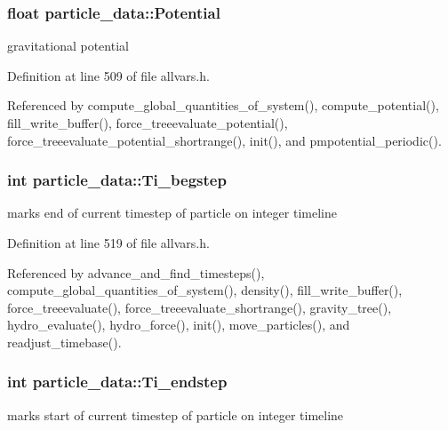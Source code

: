 \hypertarget{structparticle__data_a9d45a0cefc6121831905e169072550d0}{
\subsubsection[{Potential}]{\setlength{\rightskip}{0pt plus 5cm}float {\bf particle\_\-data::Potential}}}
\label{structparticle__data_a9d45a0cefc6121831905e169072550d0}
gravitational potential 

Definition at line 509 of file allvars.h.



Referenced by compute\_\-global\_\-quantities\_\-of\_\-system(), compute\_\-potential(), fill\_\-write\_\-buffer(), force\_\-treeevaluate\_\-potential(), force\_\-treeevaluate\_\-potential\_\-shortrange(), init(), and pmpotential\_\-periodic().

\hypertarget{structparticle__data_a6c9f057d234839cecaaeffc87b7a9794}{
\subsubsection[{Ti\_\-begstep}]{\setlength{\rightskip}{0pt plus 5cm}int {\bf particle\_\-data::Ti\_\-begstep}}}
\label{structparticle__data_a6c9f057d234839cecaaeffc87b7a9794}
marks end of current timestep of particle on integer timeline 

Definition at line 519 of file allvars.h.



Referenced by advance\_\-and\_\-find\_\-timesteps(), compute\_\-global\_\-quantities\_\-of\_\-system(), density(), fill\_\-write\_\-buffer(), force\_\-treeevaluate(), force\_\-treeevaluate\_\-shortrange(), gravity\_\-tree(), hydro\_\-evaluate(), hydro\_\-force(), init(), move\_\-particles(), and readjust\_\-timebase().

\hypertarget{structparticle__data_a9bf2c52c7378a961222d9fe8faa9c208}{
\subsubsection[{Ti\_\-endstep}]{\setlength{\rightskip}{0pt plus 5cm}int {\bf particle\_\-data::Ti\_\-endstep}}}
\label{structparticle__data_a9bf2c52c7378a961222d9fe8faa9c208}
marks start of current timestep of particle on integer timeline 

